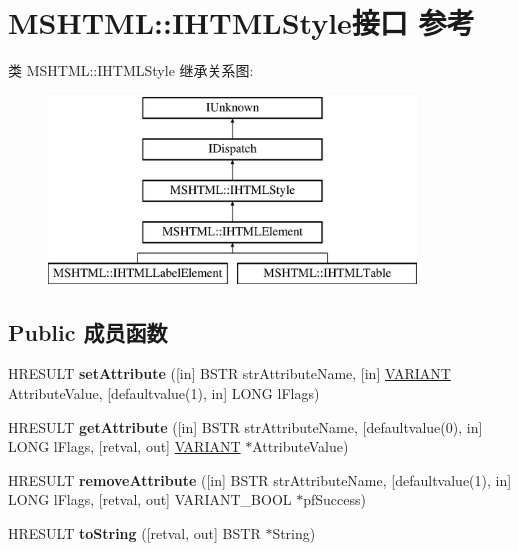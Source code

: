 \hypertarget{interface_m_s_h_t_m_l_1_1_i_h_t_m_l_style}{}\section{M\+S\+H\+T\+ML\+:\+:I\+H\+T\+M\+L\+Style接口 参考}
\label{interface_m_s_h_t_m_l_1_1_i_h_t_m_l_style}
类 M\+S\+H\+T\+ML\+:\+:I\+H\+T\+M\+L\+Style 继承关系图\+:\begin{figure}[H]
\begin{center}
\leavevmode
\includegraphics[height=5.000000cm]{interface_m_s_h_t_m_l_1_1_i_h_t_m_l_style}
\end{center}
\end{figure}
\subsection*{Public 成员函数}
\begin{DoxyCompactItemize}
\item 
\mbox{\label{interface_m_s_h_t_m_l_1_1_i_h_t_m_l_style_a0d5fb604dc3c21ed3ca186c9cb9d143b}} 
H\+R\+E\+S\+U\+LT {\bfseries set\+Attribute} (\mbox{[}in\mbox{]} B\+S\+TR str\+Attribute\+Name, \mbox{[}in\mbox{]} \hyperlink{structtag_v_a_r_i_a_n_t}{V\+A\+R\+I\+A\+NT} Attribute\+Value, \mbox{[}defaultvalue(1), in\mbox{]} L\+O\+NG l\+Flags)
\item 
\mbox{\label{interface_m_s_h_t_m_l_1_1_i_h_t_m_l_style_a74abe2db89482e94bc9043af8e867c23}} 
H\+R\+E\+S\+U\+LT {\bfseries get\+Attribute} (\mbox{[}in\mbox{]} B\+S\+TR str\+Attribute\+Name, \mbox{[}defaultvalue(0), in\mbox{]} L\+O\+NG l\+Flags, \mbox{[}retval, out\mbox{]} \hyperlink{structtag_v_a_r_i_a_n_t}{V\+A\+R\+I\+A\+NT} $\ast$Attribute\+Value)
\item 
\mbox{\label{interface_m_s_h_t_m_l_1_1_i_h_t_m_l_style_a1c49c7990a79257b62baa0fdf4b74306}} 
H\+R\+E\+S\+U\+LT {\bfseries remove\+Attribute} (\mbox{[}in\mbox{]} B\+S\+TR str\+Attribute\+Name, \mbox{[}defaultvalue(1), in\mbox{]} L\+O\+NG l\+Flags, \mbox{[}retval, out\mbox{]} V\+A\+R\+I\+A\+N\+T\+\_\+\+B\+O\+OL $\ast$pf\+Success)
\item 
\mbox{\label{interface_m_s_h_t_m_l_1_1_i_h_t_m_l_style_aa3cf1d149729f8db9a2a769a52bddae1}} 
H\+R\+E\+S\+U\+LT {\bfseries to\+String} (\mbox{[}retval, out\mbox{]} B\+S\+TR $\ast$String)
\end{DoxyCompactItemize}
